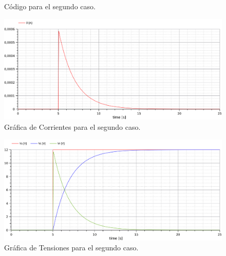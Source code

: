 
%


\begin{figure}[H]
  
  \caption{Código para el segundo caso.}
\end{figure}

\begin{figure}[H]
  \centering
  \label{gr:caso1:corrientes}
  \includegraphics[width=\textwidth]{modelica/graficas/2-corrientes}
  \caption{Gráfica de Corrientes para el segundo caso.}
\end{figure}

\begin{figure}[H]
  \centering
  \label{gr:caso1:tensiones}
  \includegraphics[width=\textwidth]{modelica/graficas/2-tensiones}
  \caption{Gráfica de Tensiones para el segundo caso.}
\end{figure}
